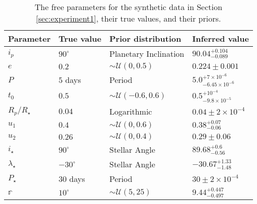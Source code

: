 \documentclass[twocolumn]{aastex631}
\begin{document}
%
%
\begin{table}[]
    \vspace{0.5cm}
    \centering
    \caption{The free parameters for the synthetic data in Section \ref{sec:experiment1}, their true values, and their priors.}
    \begin{tabular}{llll}
    \hline
    Parameter                                 & True value            & Prior distribution                   & Inferred value    \\ \hline\hline
    $i_p$                                     & $90^\circ$            & Planetary Inclination                & $90.04^{+0.104}_{-0.089}$                   \\
    $e$                                       & $0.2$                 & $\sim\mathcal{U}(0, 0.5)$            & $0.224 \pm 0.001$                     \\
    $P$                                       & $5$ days              & Period                               & $5.0^{+7\times10^{-6}}_{-6.45\times10^{-6}}$                       \\
    $t_0$                                     & $0.5$                 & $\sim\mathcal{U}(-0.6, 0.6)$         & $0.5^{+10^{-4}}_{-9.8\times10^{-5}}$                       \\
    $R_p / R_\star$                           & $0.04$                & Logarithmic                          & $0.04 \pm 2\times10^{-4}$                         \\ 
    $u_1$                                     & $0.4$                 & $\sim\mathcal{U}(0, 0.6)$            & $0.38^{+0.07}_{-0.06}$                         \\ 
    $u_2$                                     & $0.26$                & $\sim\mathcal{U}(0, 0.4)$            & $0.29 \pm 0.06$                         \\ \hline
    $i_\star$                                 & $90^\circ$            & Stellar Angle                        & $89.68^{+0.6}_{-0.56}$                      \\
    $\lambda_\star$                           & $-30^\circ$           & Stellar Angle                        & $-30.67^{+1.33}_{-1.48}$                           \\
    $P_\star$                                 & $30$ days             & Period                               & $30\pm 2 \times10^{-4}$                       \\ \hline
    $\mathbb{r}$                              & $10^\circ$            & $\sim\mathcal{U}(5, 25)$             & $9.44^{+0.447}_{-0.497}$                           \\

\end{tabular}
\end{table}
\end{document}
